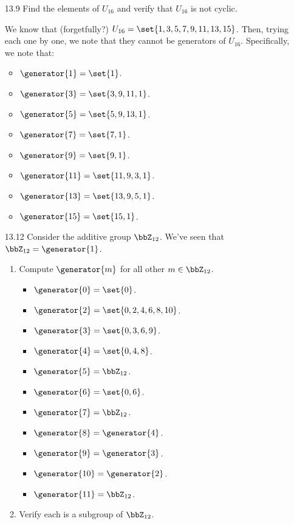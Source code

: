 \documentclass{article}
\begin{document}
\begin{enumerate}
  \item[13.9\rparen] Find the elements of $U_{16}$ and verify that $U_{16}$ is not cyclic.

        We know that (forgetfully?) $U_{16} = \set{1, 3, 5, 7, 9, 11, 13, 15}$.
        Then, trying each one by one, we note that they cannot be generators of $U_{16}$.
        Specifically, we note that:
        \begin{itemize}
          \item $\generator{1} = \set{1}$.
          \item $\generator{3} = \set{3, 9, 11, 1}$.
          \item $\generator{5} = \set{5, 9, 13, 1}$.
          \item $\generator{7} = \set{7, 1}$.
          \item $\generator{9} = \set{9, 1}$.
          \item $\generator{11} = \set{11, 9, 3, 1}$.
          \item $\generator{13} = \set{13, 9, 5, 1}$.
          \item $\generator{15} = \set{15, 1}$.
        \end{itemize}

  \item[13.12\rparen] Consider the additive group $\bbZ_{12}$.
        We've seen that $\bbZ_{12} = \generator{1}$.
        \begin{enumerate}[start=1,label={\lparen\alph*\rparen}]
          \item Compute $\generator{m}$ for all other $m \in \bbZ_{12}$.
                \begin{itemize}
                  \item $\generator{0} = \set{0}$.
                  \item $\generator{2} = \set{0, 2, 4, 6, 8, 10}$.
                  \item $\generator{3} = \set{0, 3, 6, 9}$.
                  \item $\generator{4} = \set{0, 4, 8}$.
                  \item $\generator{5} = \bbZ_{12}$.
                  \item $\generator{6} = \set{0, 6}$.
                  \item $\generator{7} = \bbZ_{12}$.
                  \item $\generator{8} = \generator{4}$.
                  \item $\generator{9} = \generator{3}$.
                  \item $\generator{10} = \generator{2}$.
                  \item $\generator{11} = \bbZ_{12}$.
                \end{itemize}
          \item Verify each is a subgroup of $\bbZ_{12}$.


\end{enumerate}
\end{enumerate}
\end{document}
